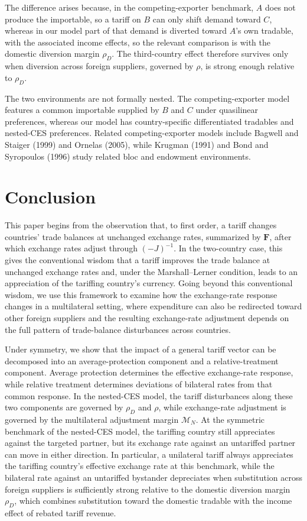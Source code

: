 \documentclass[11pt]{article}
\begin{document}
The difference arises because, in the competing-exporter benchmark, $A$ does not produce the importable, so a tariff on $B$ can only shift demand toward $C$, whereas in our model part of that demand is diverted toward $A$'s own tradable, with the associated income effects, so the relevant comparison is with the domestic diversion margin $\rho_D$. The third-country effect therefore survives only when diversion across foreign suppliers, governed by $\rho$, is strong enough relative to $\rho_D$.

The two environments are not formally nested. The competing-exporter model features a common importable supplied by $B$ and $C$ under quasilinear preferences, whereas our model has country-specific differentiated tradables and nested-CES preferences. Related competing-exporter models include Bagwell and Staiger (1999) and Ornelas (2005), while Krugman (1991) and Bond and Syropoulos (1996) study related bloc and endowment environments.
\section{Conclusion}

This paper begins from the observation that, to first order, a tariff changes countries' trade balances at unchanged exchange rates, summarized by $\boldsymbol{F}$, after which exchange rates adjust through $(-J)^{-1}$. In the two-country case, this gives the conventional wisdom that a tariff improves the trade balance at unchanged exchange rates and, under the Marshall--Lerner condition, leads to an appreciation of the tariffing country's currency. Going beyond this conventional wisdom, we use this framework to examine how the exchange-rate response changes in a multilateral setting, where expenditure can also be redirected toward other foreign suppliers and the resulting exchange-rate adjustment depends on the full pattern of trade-balance disturbances across countries.

Under symmetry, we show that the impact of a general tariff vector can be decomposed into an average-protection component and a relative-treatment component. Average protection determines the effective exchange-rate response, while relative treatment determines deviations of bilateral rates from that common response. In the nested-CES model, the tariff disturbances along these two components are governed by $\rho_D$ and $\rho$, while exchange-rate adjustment is governed by the multilateral adjustment margin $\mathcal M_N$. At the symmetric benchmark of the nested-CES model, the tariffing country still appreciates against the targeted partner, but its exchange rate against an untariffed partner can move in either direction. In particular, a unilateral tariff always appreciates the tariffing country's effective exchange rate at this benchmark, while the bilateral rate against an untariffed bystander depreciates when substitution across foreign suppliers is sufficiently strong relative to the domestic diversion margin $\rho_D$, which combines substitution toward the domestic tradable with the income effect of rebated tariff revenue.
\end{document}
